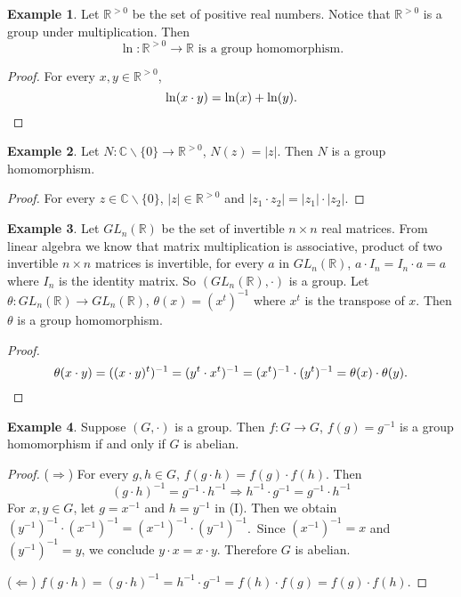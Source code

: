 \documentclass{article}
\theoremstyle{plain}
\theoremstyle{definition}
\newtheorem{example}{Example}
\newcommand{\FR}{\mathbb{R}}
\newcommand{\FC}{\mathbb{C}}
\begin{document}
\begin{example}
    Let $\FR^{>0}$ be the set of positive
    real numbers. Notice that $\FR^{>0}$ is a group
    under multiplication. Then 
    \[\ln:\FR^{>0}\to\FR\text{ is a group homomorphism.}\]
\end{example}

\begin{proof}
    For every $x,y\in\FR^{>0}$,
    \[\ln(x\cdot y)=\ln(x)+\ln(y).\qedhere\]
\end{proof}

\begin{example}
    Let $N:\FC\backslash\{0\}\to\FR^{>0}$, $N(z)=|z|$. Then 
    $N$ is a group homomorphism.
\end{example}

\begin{proof}
    For every $z\in\FC\backslash\{0\}$, $|z|\in\FR^{>0}$
    and $|z_1\cdot z_2|=|z_1|\cdot|z_2|$.
\end{proof}

\begin{example}
    Let $GL_n(\FR)$ be the set of invertible $n\times n$
    real matrices. From linear algebra we know that matrix
    multiplication is associative, product of two
    invertible $n\times n$ matrices is invertible, for
    every $a$ in $GL_n(\FR)$, $a\cdot I_n=I_n\cdot a=a$
    where $I_n$ is the identity matrix.
    So $(GL_n(\FR),\cdot)$ is a group. Let $\theta:GL_n(\FR)\to GL_n(\FR)$,
    $\theta(x)=(x^t)^{-1}$ where $x^t$ is the transpose of $x$. Then
    $\theta$ is a group homomorphism.
\end{example}

\begin{proof}
    \[\theta(x\cdot y)=((x\cdot y)^t)^{-1}=(y^t\cdot x^t)^{-1}=(x^t)^{-1}\cdot(y^t)^{-1}=\theta(x)\cdot\theta(y).\qedhere\]
\end{proof}

\begin{example}
    Suppose $(G,\cdot)$ is a group. Then $f:G\to G$, $f(g)=g^{-1}$
    is a group homomorphism if and only if $G$ is abelian.
\end{example}

\begin{proof}
    ($\Rightarrow$) For every $g,h\in G$, $f(g\cdot h)=f(g)\cdot f(h)$.
    Then 
    \begin{equation}
        (g\cdot h)^{-1}=g^{-1}\cdot h^{-1}\Rightarrow h^{-1}\cdot g^{-1}=g^{-1}\cdot h^{-1}\tag{I}
    \end{equation}
    For $x,y\in G$, let $g=x^{-1}$ and $h=y^{-1}$ in (I). Then
    we obtain $(y^{-1})^{-1}\cdot (x^{-1})^{-1}=(x^{-1})^{-1}\cdot(y^{-1})^{-1}$.\
    Since $(x^{-1})^{-1}=x$ and $(y^{-1})^{-1}=y$, we conclude
    $y\cdot x=x\cdot y$. Therefore $G$ is abelian.

    ($\Leftarrow$) $f(g\cdot h)=(g\cdot h)^{-1}=h^{-1}\cdot g^{-1}=f(h)\cdot f(g)=f(g)\cdot f(h)$.
\end{proof}
\end{document}
